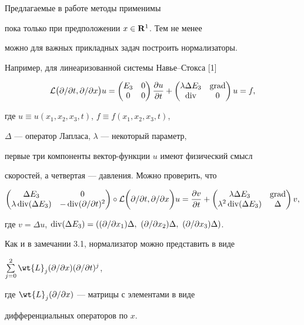 \begin{notes}


Предлагаемые в работе методы применимы


пока только при предположении $x\in {\bold R}^1$. Тем не менее


можно для важных прикладных задач построить нормализаторы.


Например, для линеаризованной системы Навье--Стокса [1]


$$


{\cal L}\big (\partial /\partial t,\partial /\partial x\big)u=


\begin{pmatrix} E_3 & 0\\ 0 & 0\end{pmatrix}\frac{\partial u}{\partial t}+


\begin{pmatrix} \lambda \Delta E_3 & \Grad \\ \Div & 0\end{pmatrix}u=f,


$$


где $u\equiv u(x_1,x_2,x_3,t)$, $f\equiv f(x_1,x_2,x_3,t)$,


$\Delta$ --- оператор Лапласа, $\lambda$ --- некоторый параметр,


первые три компоненты вектор-функции $u$ имеют физический смысл


скоростей, а четвертая --- давления. Можно проверить, что


$$


\begin{pmatrix} \Delta E_3 & 0\\ \lambda \Div(\Delta E_3) &


-\Div(\partial /\partial t)^2\end{pmatrix}\circ


{\cal L}\bigg (\partial /\partial t,\partial /\partial x\bigg )u=


\frac{\partial v}{\partial t}+


\begin{pmatrix} \lambda \Delta E_3 &


\Grad \\ \lambda ^2\Div (\Delta E_3) & \Delta \end{pmatrix}v,


$$


где $v=\Delta u$, $\Div (\Delta E_3)=(


(\partial /\partial x_1)\Delta, \


(\partial /\partial x_2)\Delta, \ (\partial /\partial x_3)\Delta)$.


Как и в замечании 3.1, нормализатор можно представить в виде 


$\sum\limits_{j=0}^2\wt {L}_j(\partial /\partial x)(\partial /\partial t)^j$,


где $\wt {L}_j(\partial /\partial x)$ --- матрицы с элементами в виде


дифференциальных операторов по $x$.


\end{notes}








